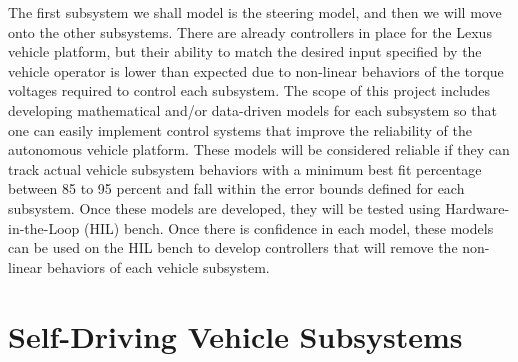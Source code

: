 \documentclass[conference]{IEEEtran}
\begin{document}
%
The first subsystem we shall model is the steering model, and then we will move onto
the other subsystems. There are already controllers in place for the Lexus
vehicle platform, but their ability to match the desired input specified by the vehicle operator
is lower than expected due to non-linear
behaviors of the torque voltages required to control each subsystem. The scope
of this project includes developing mathematical and/or data-driven models for each subsystem so that one can easily implement control systems that improve the reliability of the
autonomous vehicle platform. These models will be considered reliable if they can track actual vehicle subsystem behaviors with a minimum best fit percentage between 85 to 95 percent and fall within the error bounds defined for each subsystem. Once these models are developed, they will be tested using Hardware-in-the-Loop (HIL) bench.
Once there is confidence in each model, these models can be used on the   HIL bench to develop controllers that will remove the non-linear behaviors of each vehicle subsystem.


\section{Self-Driving Vehicle Subsystems}
\label{sec:selfDrivingVehicleOverview}
\end{document}
